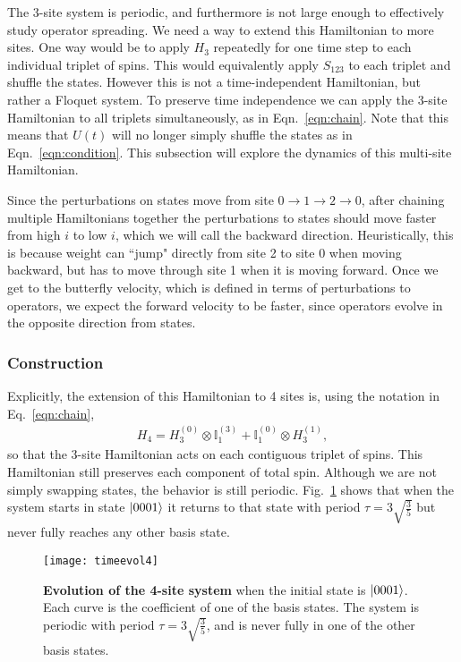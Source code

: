 The 3-site system is periodic, and furthermore is not large enough to effectively study operator spreading. We need a way to extend this Hamiltonian to more sites. One way would be to apply $H_3$ repeatedly for one time step to each individual triplet of spins. This would equivalently apply $S_{123}$ to each triplet and shuffle the states. However this is not a time-independent Hamiltonian, but rather a Floquet system. To preserve time independence we can apply the 3-site Hamiltonian to all triplets simultaneously, as in Eqn.~\ref{eqn:chain}. Note that this means that $U(t)$ will no longer simply shuffle the states as in  Eqn.~\ref{eqn:condition}. This subsection will explore the dynamics of this multi-site Hamiltonian.

Since the perturbations on states move from site $0\to1\to2\to0$, after chaining multiple Hamiltonians together the perturbations to states should move faster from high $i$ to low $i$, which we will call the backward direction. Heuristically, this is because weight can ``jump" directly from site 2 to site 0 when moving backward, but has to move through site 1 when it is moving forward. Once we get to the butterfly velocity, which is defined in terms of perturbations to operators, we expect the forward velocity to be faster, since operators evolve in the opposite direction from states.

\subsubsection{Construction} \label{subsub:construction} 

Explicitly, the extension of this Hamiltonian to 4 sites is, using the notation in Eq.~\ref{eqn:chain},
\begin{align}
H_4 = H_3^{(0)}\otimes\mathbb{I}_1^{(3)} + \mathbb{I}_1^{(0)}\otimes H_3^{(1)},
\end{align}
so that the 3-site Hamiltonian acts on each contiguous triplet of spins.
This Hamiltonian still preserves each component of total spin. Although we are not simply swapping states, the behavior is still periodic. Fig.~\ref{fig:timeevol4} shows that when the system starts in state $\left|0001\right\rangle$ it returns to that state with period $\tau=3\sqrt{\frac{3}{5}}$ but never fully reaches any other basis state.
\begin{figure}
\centering
\texttt{[image: timeevol4]}
\caption{\textbf{Evolution of the 4-site system} when the initial state is $\left|0001\right\rangle$. Each curve is the coefficient of one of the basis states. The system is periodic with period $\tau=3\sqrt{\frac{3}{5}}$, and is never fully in one of the other basis states.}
\label{fig:timeevol4}
\end{figure}

